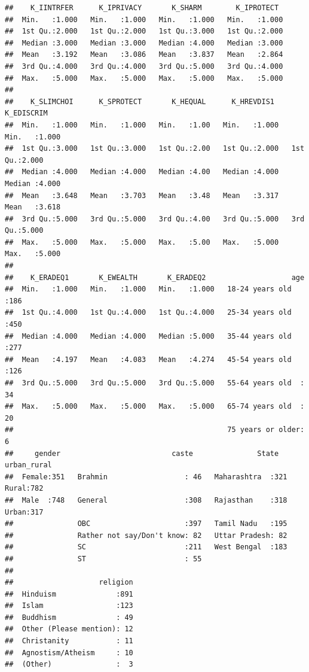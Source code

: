 \documentclass[
]{article}
\begin{document}
\begin{verbatim}
##    K_IINTRFER      K_IPRIVACY       K_SHARM        K_IPROTECT   
##  Min.   :1.000   Min.   :1.000   Min.   :1.000   Min.   :1.000  
##  1st Qu.:2.000   1st Qu.:2.000   1st Qu.:3.000   1st Qu.:2.000  
##  Median :3.000   Median :3.000   Median :4.000   Median :3.000  
##  Mean   :3.192   Mean   :3.086   Mean   :3.837   Mean   :2.864  
##  3rd Qu.:4.000   3rd Qu.:4.000   3rd Qu.:5.000   3rd Qu.:4.000  
##  Max.   :5.000   Max.   :5.000   Max.   :5.000   Max.   :5.000  
##                                                                 
##    K_SLIMCHOI      K_SPROTECT       K_HEQUAL      K_HREVDIS1      K_EDISCRIM   
##  Min.   :1.000   Min.   :1.000   Min.   :1.00   Min.   :1.000   Min.   :1.000  
##  1st Qu.:3.000   1st Qu.:3.000   1st Qu.:2.00   1st Qu.:2.000   1st Qu.:2.000  
##  Median :4.000   Median :4.000   Median :4.00   Median :4.000   Median :4.000  
##  Mean   :3.648   Mean   :3.703   Mean   :3.48   Mean   :3.317   Mean   :3.618  
##  3rd Qu.:5.000   3rd Qu.:5.000   3rd Qu.:4.00   3rd Qu.:5.000   3rd Qu.:5.000  
##  Max.   :5.000   Max.   :5.000   Max.   :5.00   Max.   :5.000   Max.   :5.000  
##                                                                                
##    K_ERADEQ1       K_EWEALTH       K_ERADEQ2                    age     
##  Min.   :1.000   Min.   :1.000   Min.   :1.000   18-24 years old  :186  
##  1st Qu.:4.000   1st Qu.:4.000   1st Qu.:4.000   25-34 years old  :450  
##  Median :4.000   Median :4.000   Median :5.000   35-44 years old  :277  
##  Mean   :4.197   Mean   :4.083   Mean   :4.274   45-54 years old  :126  
##  3rd Qu.:5.000   3rd Qu.:5.000   3rd Qu.:5.000   55-64 years old  : 34  
##  Max.   :5.000   Max.   :5.000   Max.   :5.000   65-74 years old  : 20  
##                                                  75 years or older:  6  
##     gender                          caste               State     urban_rural
##  Female:351   Brahmin                  : 46   Maharashtra  :321   Rural:782  
##  Male  :748   General                  :308   Rajasthan    :318   Urban:317  
##               OBC                      :397   Tamil Nadu   :195              
##               Rather not say/Don't know: 82   Uttar Pradesh: 82              
##               SC                       :211   West Bengal  :183              
##               ST                       : 55                                  
##                                                                              
##                    religion  
##  Hinduism              :891  
##  Islam                 :123  
##  Buddhism              : 49  
##  Other (Please mention): 12  
##  Christanity           : 11  
##  Agnostism/Atheism     : 10  
##  (Other)               :  3
\end{verbatim}
\end{document}
